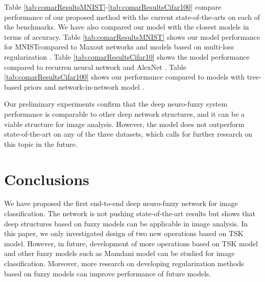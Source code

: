 \documentclass{article}
\begin{document}
Table \ref{tab:comarResultsMNIST}-\ref{tab:comarResultsCifar100} compare performance of our proposed method with the current state-of-the-arts on each of the benchmarks. We have also compared our model with the closest models in terms of accuracy. Table \ref{tab:comarResultsMNIST} shows our model performance for MNISTcompared to Maxout networks \cite{goodfellow2013maxout} and models based on multi-loss regularization \cite{xu2015multi}. Table \ref{tab:comarResultsCifar10} shows the model performance compared to recurren neural network \cite{visin2015renet} and AlexNet \cite{krizhevsky2012imagenet}. Table \ref{tab:comarResultsCifar100} shows our performance compared to models with tree-based priors \cite{srivastava2013discriminative} and network-in-network model \cite{lin2013network}.

Our preliminary experiments confirm that the deep neuro-fuzzy system performance is comparable to other deep network structures, and it can be a viable structure for image analysis. However, the model does not outperform state-of-the-art on any of the three datasets, which calls for further research on this topic in the future.


\section{Conclusions}

We have proposed the first end-to-end deep neuro-fuzzy network for image classification. The network is not pushing state-of-the-art results but shows that deep structures based on fuzzy models can be applicable in image analysis. In this paper, we only investigated design of two new operations based on TSK model. However, in future, development of more operations based on TSK model and other fuzzy models such as Mamdani model \cite{pedrycz2007fuzzy} can be studied for image classification. Moreover, more research on developing regularization methods based on fuzzy models can improve performance of future models.

\small



\end{document}
